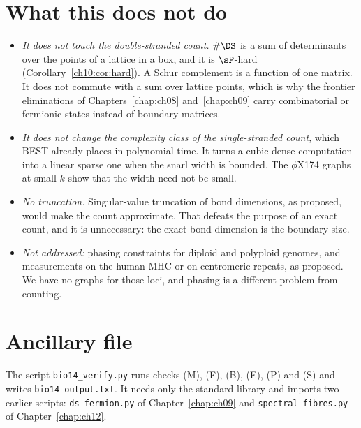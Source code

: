 \section{What this does not do}\label{ch16:sec:not}

\begin{itemize}
\item \emph{It does not touch the double-stranded count.} $\#\DS$ is a sum of determinants over the points
of a lattice in a box, and it is $\sP$-hard (Corollary~\ref{ch10:cor:hard}). A Schur complement is a function of one
matrix. It does not commute with a sum over lattice points, which is why the frontier eliminations of
Chapters~\ref{chap:ch08} and~\ref{chap:ch09} carry combinatorial or fermionic states instead of
boundary matrices.
\item \emph{It does not change the complexity class of the single-stranded count}, which BEST already
places in polynomial time. It turns a cubic dense computation into a linear sparse one when the snarl
width is bounded. The $\phi$X174 graphs at small $k$ show that the width need not be small.
\item \emph{No truncation.} Singular-value truncation of bond dimensions, as proposed, would make the
count approximate. That defeats the purpose of an exact count, and it is unnecessary: the exact bond
dimension is the boundary size.
\item \emph{Not addressed:} phasing constraints for diploid and polyploid genomes, and measurements on
the human MHC or on centromeric repeats, as proposed. We have no graphs for those loci, and phasing is a
different problem from counting.
\end{itemize}

\section*{Ancillary file}
The script \texttt{bio14\_verify.py} runs checks (M), (F), (B), (E), (P) and (S) and writes
\texttt{bio14\_output.txt}. It needs only the standard library and imports two earlier scripts:
\texttt{ds\_fermion.py} of Chapter~\ref{chap:ch09} and \texttt{spectral\_fibres.py} of
Chapter~\ref{chap:ch12}.
